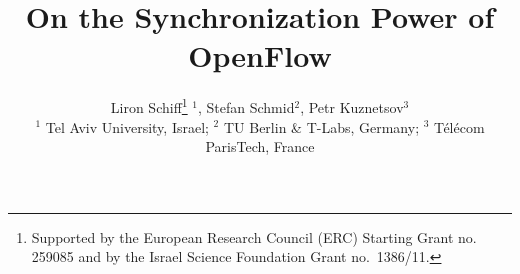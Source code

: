 \documentclass[conference]{sigcomm-alternate}
\begin{document}
\sloppy





\title{On the Synchronization Power of OpenFlow}



\author{
Liron Schiff\thanks{Supported by the European Research Council (ERC) Starting Grant no. 259085 and by the Israel Science Foundation Grant no.~1386/11.} $^1$,
Stefan Schmid$^2$, Petr Kuznetsov$^3$ \\
\small $^1$ Tel Aviv University, Israel; $^2$ TU Berlin \& T-Labs,
Germany; $^3$ T\'el\'ecom ParisTech, France
}


\date{}


\maketitle


\thispagestyle{empty}


\end{document}
